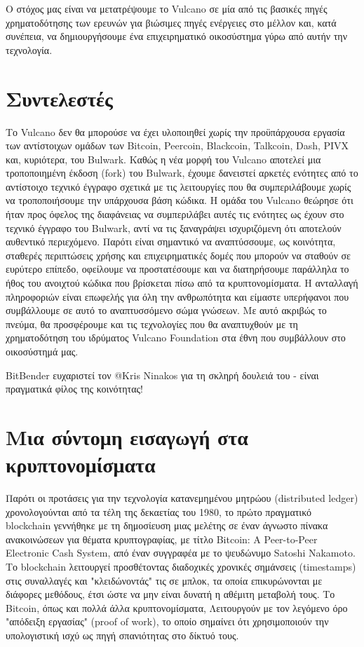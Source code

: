 \documentclass[A4paper, 12pt]{article}
\begin{document}
Ο στόχος μας είναι να μετατρέψουμε το Vulcano σε μία από τις βασικές πηγές χρηματοδότησης των ερευνών για βιώσιμες πηγές ενέργειες στο μέλλον και, κατά συνέπεια, να δημιουργήσουμε ένα επιχειρηματικό οικοσύστημα γύρω από αυτήν την τεχνολογία.

\section{Συντελεστές}
Το Vulcano δεν θα μπορούσε να έχει υλοποιηθεί χωρίς την προϋπάρχουσα εργασία των αντίστοιχων ομάδων των Bitcoin, Peercoin, Blackcoin, Talkcoin, Dash, PIVX και, κυριότερα, του Bulwark. Καθώς η νέα μορφή του Vulcano αποτελεί μια τροποποιημένη έκδοση (fork) του Bulwark, έχουμε δανειστεί αρκετές ενότητες από το αντίστοιχο τεχνικό έγγραφο σχετικά με τις λειτουργίες που θα συμπεριλάβουμε χωρίς να τροποποιήσουμε την υπάρχουσα βάση κώδικα. Η ομάδα του Vulcano θεώρησε ότι ήταν προς όφελος της διαφάνειας να συμπεριλάβει αυτές τις ενότητες ως έχουν στο τεχνικό έγγραφο του Bulwark, αντί να τις ξαναγράψει ισχυριζόμενη ότι αποτελούν αυθεντικό περιεχόμενο. Παρότι είναι σημαντικό να αναπτύσσουμε, ως κοινότητα, σταθερές περιπτώσεις χρήσης και επιχειρηματικές δομές που μπορούν να σταθούν σε ευρύτερο επίπεδο, οφείλουμε να προστατέσουμε και να διατηρήσουμε παράλληλα το ήθος του ανοιχτού κώδικα που βρίσκεται πίσω από τα κρυπτονομίσματα. Η ανταλλαγή πληροφοριών είναι επωφελής για όλη την ανθρωπότητα και είμαστε υπερήφανοι που συμβάλλουμε σε αυτό το αναπτυσσόμενο σώμα γνώσεων. Με αυτό ακριβώς το πνεύμα, θα προσφέρουμε και τις τεχνολογίες που θα αναπτυχθούν με τη χρηματοδότηση του ιδρύματος Vulcano Foundation στα έθνη που συμβάλλουν στο οικοσύστημά μας.

BitBender ευχαριστεί τον @Kris Ninakos για τη σκληρή δουλειά του - είναι πραγματικά φίλος της κοινότητας!

\section{Μια σύντομη εισαγωγή στα κρυπτονομίσματα}
Παρότι οι προτάσεις για την τεχνολογία κατανεμημένου μητρώου (distributed ledger) χρονολογούνται από τα τέλη της δεκαετίας του 1980, το πρώτο πραγματικό blockchain γεννήθηκε με τη δημοσίευση μιας μελέτης σε έναν άγνωστο πίνακα ανακοινώσεων για θέματα κρυπτογραφίας, με τίτλο Bitcoin: A Peer-to-Peer Electronic Cash System, από έναν συγγραφέα με το ψευδώνυμο Satoshi Nakamoto. Το blockchain λειτουργεί προσθέτοντας διαδοχικές χρονικές σημάνσεις (timestamps) στις συναλλαγές και "κλειδώνοντάς" τις σε μπλοκ, τα οποία επικυρώνονται με διάφορες μεθόδους, έτσι ώστε να μην είναι δυνατή η αθέμιτη μεταβολή τους. Το Bitcoin, όπως και πολλά άλλα κρυπτονομίσματα, Λειτουργούν με τον λεγόμενο όρο "απόδειξη εργασίας" (proof of work), το οποίο σημαίνει ότι χρησιμοποιούν την υπολογιστική ισχύ ως πηγή σπανιότητας στο δίκτυό τους.
\end{document}
